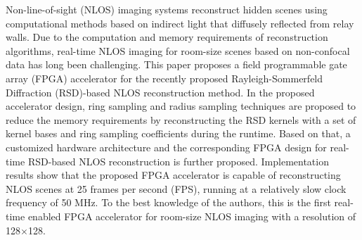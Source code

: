 \documentclass[master]{shtthesis}             %
\begin{document}
\maketitle

\frontmatter
\begin{abstract}[flattitle]
  非视域（NLOS）成像系统使用基于从中继墙漫射反射的间接光的计算方法重构隐藏场景。由于重构算法的计算和存储需求，基于非共焦数据的室内场景的实时NLOS成像一直是一个挑战。针对最近提出的基于瑞利-索末菲衍射（RSD）的非视域重构方法，本文设计了一种现场可编程门阵列（FPGA）加速器。在所设计的加速器设计中，本文提出了环采样和半径采样技术。通过这两项技术，加速器在运行时使用一组内核基和环采样系数来重构RSD卷积核来减少存储需求。在此基础上，本文进一步提出了一种基于RSD的非视域实时重构的定制硬件架构和相应的FPGA设计。实现结果表明，该FPGA加速器能够以每秒25帧（FPS）的速度重构非视域场景，并以相对较慢的时钟频率（50MHz）运行。据作者所知，这是第一个用于室内非视域成像的实时FPGA加速器，分辨率为128$\times$128。
\end{abstract}

\begin{abstract*}[flattitle]
  Non-line-of-sight (NLOS) imaging systems reconstruct hidden scenes using computational methods based on indirect light that diffusely reflected from relay walls. Due to the computation and memory requirements of reconstruction algorithms, real-time NLOS imaging for room-size scenes based on non-confocal data has long been challenging. This paper proposes a field programmable gate array (FPGA) accelerator for the recently proposed Rayleigh-Sommerfeld Diffraction (RSD)-based NLOS reconstruction method. In the proposed accelerator design, ring sampling and radius sampling techniques are proposed to reduce the memory requirements by reconstructing the RSD kernels with a set of kernel bases and ring sampling coefficients during the runtime. Based on that, a customized hardware architecture and the corresponding FPGA design for real-time RSD-based NLOS reconstruction is further proposed. Implementation results show that the proposed FPGA accelerator is capable of reconstructing NLOS scenes at 25 frames per second (FPS), running at a relatively slow clock frequency of 50 MHz. To the best knowledge of the authors, this is the first real-time enabled FPGA accelerator for room-size NLOS imaging with a resolution of 128$\times$128.
\end{abstract*}

\makeindices
\end{document}
